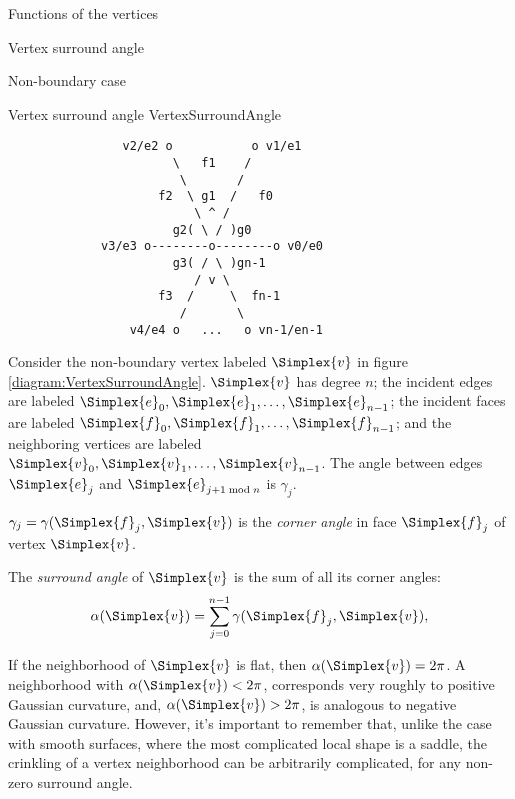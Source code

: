 \begin{plSection}{Functions of the vertices}
\label{sec:vertices}
\begin{plSection}{Vertex surround angle}
\label{sec:vertex_surround_angle}
\begin{plSection}{Non-boundary case}
\label{sec:non_boundary_vertex_surround_angle}

\begin{plDiagram}
{Vertex surround angle}
{VertexSurroundAngle}
\centering
\begin{verbatim}
                v2/e2 o           o v1/e1
                       \   f1    /
                        \       /
                     f2  \ g1  /   f0
                          \ ^ /
                       g2( \ / )g0
             v3/e3 o--------o--------o v0/e0
                       g3( / \ )gn-1
                          / v \
                     f3  /     \  fn-1
                        /       \
                 v4/e4 o   ...   o vn-1/en-1
\end{verbatim}
\end{plDiagram}

Consider the non-boundary vertex
labeled $\Simplex{v}$ in figure \ref{diagram:VertexSurroundAngle}.
$\Simplex{v}$ has degree $n$;
the incident edges are labeled $\Simplex{e}_0, \Simplex{e}_1, \ldots, \Simplex{e}_{n-1}$;
the incident faces are labeled $\Simplex{f}_0, \Simplex{f}_1, \ldots, \Simplex{f}_{n-1}$;
and the neighboring vertices are labeled $\Simplex{v}_0, \Simplex{v}_1, \ldots, \Simplex{v}_{n-1}$.
The angle between edges $\Simplex{e}_j$ and $\Simplex{e}_{j + 1 \bmod n}$ is $\gamma_j$.

$\gamma_j = \gamma(\Simplex{f}_j,\Simplex{v})$ is the {\em corner angle} in face $\Simplex{f}_j$
of vertex $\Simplex{v}$.

The {\em surround angle} of $\Simplex{v}$ is the sum of all its corner angles:
\begin{equation}
\alpha(\Simplex{v}) = \sum_{j=0}^{n-1} \gamma(\Simplex{f}_j,\Simplex{v}),
\end{equation}

If the neighborhood of $\Simplex{v}$ is flat, then $\alpha(\Simplex{v})=2\pi$.
A neighborhood with $\alpha(\Simplex{v}) < 2\pi$, corresponds very roughly
to positive Gaussian curvature,
and, $\alpha(\Simplex{v}) > 2\pi$,
is analogous to negative Gaussian curvature.
However, it's important to remember that, unlike the case
with smooth surfaces, where the most complicated local
shape is a saddle,
the crinkling of a vertex neighborhood can be arbitrarily complicated,
for any non-zero surround angle.


\end{plSection}
\end{plSection}
\end{plSection}
